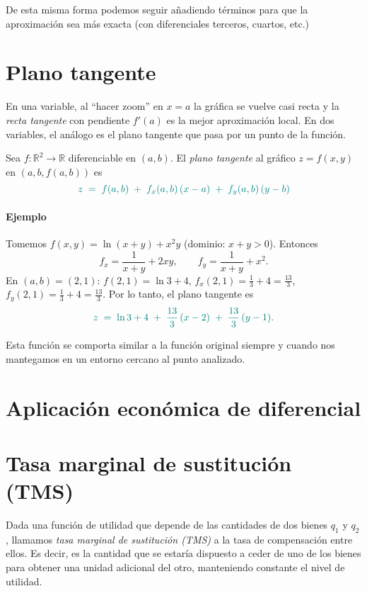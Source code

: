 \documentclass{article}
\begin{document}
De esta misma forma podemos seguir añadiendo términos para que la aproximación sea más exacta (con diferenciales terceros, cuartos, etc.)



\section*{Plano tangente}



En una variable, al “hacer zoom” en \(x=a\) la gráfica se vuelve casi recta y la \emph{recta tangente} con pendiente \(f'(a)\) es la mejor aproximación local.  
En dos variables, el análogo es el plano tangente que pasa por un punto de la función. 

Sea \(f:\mathbb{R}^2\to\mathbb{R}\) diferenciable en \((a,b)\). El \emph{plano tangente} al gráfico \(z=f(x,y)\) en \((a,b,f(a,b))\) es
\[
\color{teal}
z \;=\; f(a,b) \;+\; f_x(a,b)\,(x-a) \;+\; f_y(a,b)\,(y-b)
\]


\paragraph*{Ejemplo}
Tomemos \(f(x,y)=\ln(x+y)+x^{2}y\) (dominio: \(x+y>0\)). Entonces
\[
f_x=\frac{1}{x+y}+2xy, \qquad f_y=\frac{1}{x+y}+x^2.
\]
En \((a,b)=(2,1)\): \(f(2,1)=\ln 3+4\), \(f_x(2,1)=\tfrac{1}{3}+4=\tfrac{13}{3}\), \(f_y(2,1)=\tfrac{1}{3}+4=\tfrac{13}{3}\).
Por lo tanto, el plano tangente es
\[
\color{teal}
z \;=\; \ln 3 + 4 \;+\; \frac{13}{3}\,(x-2) \;+\; \frac{13}{3}\,(y-1).
\]

Esta función se comporta similar a la función original siempre y cuando nos mantegamos en un entorno cercano al punto analizado.




\newpage
\section{Aplicación económica de diferencial}



\section*{Tasa marginal de sustitución (TMS)}

Dada una función de utilidad que depende de las cantidades de dos bienes \( q_1 \) y \( q_2 \), llamamos \textit{tasa marginal de sustitución (TMS)} a la tasa de compensación entre ellos. Es decir, es la cantidad que se estaría dispuesto a ceder de uno de los bienes para obtener una unidad adicional del otro, manteniendo constante el nivel de utilidad.
\end{document}
